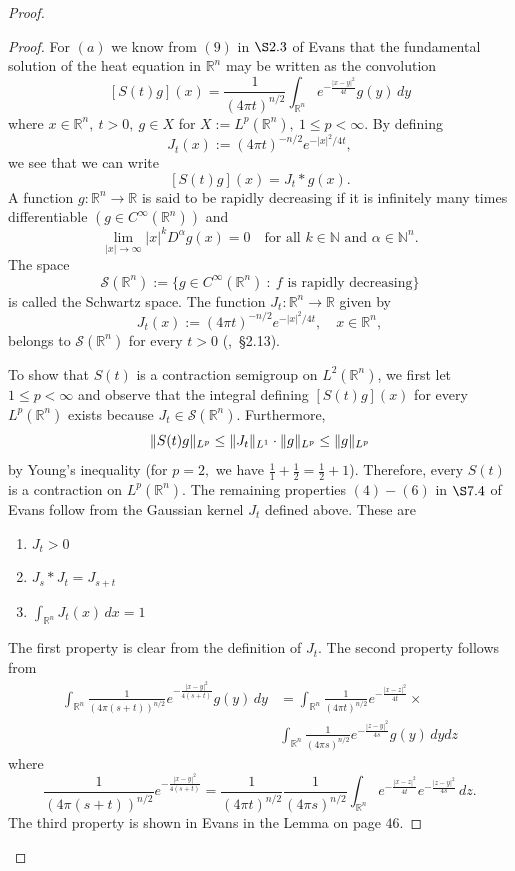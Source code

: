 \documentclass{article}
\DeclarePairedDelimiter{\norm}{\lVert}{\rVert}
\begin{document}
\begin{flushleft}
\begin{proof}
\begin{proof}
For $(a)$ we know from $(9)$ in $\S 2.3$ of Evans that the fundamental solution of the heat equation in $\mathbb R^n$ may be written as the convolution
$$[S(t)g](x) = \frac{1}{(4\pi t)^{n/2}}\int_{\mathbb R^n} e^{-\frac{|x-y|^2}{4t}}g(y)\,dy$$
where $x\in\mathbb R^n,~t>0,~ g\in X$ for $X:=L^p(\mathbb R^n),~1\le p < \infty$. By defining
$$J_t(x):=(4\pi t)^{-n/2} e^{-|x|^2/{4t}},$$
we see that we can write
$$[S(t)g](x)=J_t * g(x).$$
A function $g:\mathbb R^n \to \mathbb R$ is said to be rapidly decreasing if it is infinitely many times differentiable $\left(g\in C^{\infty}(\mathbb R^n)\right)$ and
$$\lim_{|x|\to\infty} |x|^k D^{\alpha}g(x)=0\quad \text{for all $k\in\mathbb N$ and $\alpha\in\mathbb N^n.$}$$
The space
$$\mathscr{S}(\mathbb R^n):=\{g\in C^{\infty}(\mathbb R^n)~:~\text{$f$ is rapidly decreasing}\}$$
is called the Schwartz space. The function $J_t: \mathbb R^n \to \mathbb R$ given by 
$$J_t(x):=(4\pi t)^{-n/2} e^{-|x|^2/{4t}},\quad x\in\mathbb R^n,$$
belongs to $\mathscr{S}(\mathbb R^n)$ for every $t>0$ (\cite{engel2001one},~\S 2.13).

To show that $S(t)$ is a contraction semigroup on $L^2(\mathbb R^n)$, we first let $1\le p < \infty$ and observe that the integral defining $[S(t)g](x)$ for every $L^p(\mathbb R^n)$ exists because $J_t\in \mathscr{S}(\mathbb R^n).$ Furthermore,
$$\norm{S(t)g}_{L^p} \le \norm{J_t}_{L^1}\cdot \norm{g}_{L^p} \le \norm{g}_{L^p}$$
by Young's inequality (for $p=2,$ we have $\frac{1}{1}+\frac{1}{2}=\frac{1}{2}+1$). Therefore, every $S(t)$ is a contraction on $L^p(\mathbb R^n)$. The remaining properties $(4) - (6)$ in $\S 7.4$ of Evans follow from the Gaussian kernel $J_t$ defined above. These are
\begin{enumerate}
    \item  \begin{center} $J_t >0$ \end{center}
    \item  \begin{center} $J_s * J_t = J_{s+t}$ \end{center}
    \item  \begin{center} $\int_{\mathbb R^n} J_t(x) \,dx=1$ \end{center}
\end{enumerate}
The first property is clear from the definition of $J_t$. The second property follows from
\begin{align*}\int_{\mathbb R^n}\frac{1}{(4\pi(s+t))^{n/2}}e^{-\frac{|x-y|^2}{4(s+t)}}g(y)\,dy &= \int_{\mathbb R^n}\frac{1}{(4\pi t)^{n/2}}e^{-\frac{|x-z|^2}{4t}}\times\\&\int_{\mathbb R^n}\frac{1}{(4\pi s)^{n/2}}e^{-\frac{|z-y|^2}{4s}}g(y)\,dydz
\end{align*}
where
$$\frac{1}{(4\pi(s+t))^{n/2}}e^{-\frac{|x-y|^2}{4(s+t)}}=\frac{1}{(4\pi t)^{n/2}}\frac{1}{(4\pi s)^{n/2}}\int_{\mathbb R^n}e^{-\frac{|x-z|^2}{4t}}e^{-\frac{|z-y|^2}{4s}}\,dz.$$
The third property is shown in Evans in the Lemma on page $46$.


\end{proof}
\end{proof}
\end{flushleft}
\end{document}
